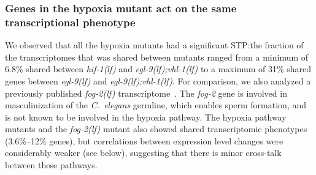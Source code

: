 \documentclass[9pt,twocolumn,twoside,lineno]{pnas-new}
\newcommand{\cel}{\emph{C.~elegans}}
\newcommand{\gene}[1]{\emph{#1}}
\newcommand{\fog}{\emph{\mbox{fog-2(lf)}}}
\newcommand{\egl}{\emph{\mbox{egl-9}(lf)}}
\newcommand{\rhy}{\emph{\mbox{rhy-1}(lf)}}
\newcommand{\eglvhl}{\emph{\mbox{egl-9(lf);vhl-1(lf)}}}
\newcommand{\hif}{\emph{\mbox{hif-1(lf)}}}
\begin{document}
\subsubsection*{Genes in the hypoxia mutant act on the same transcriptional phenotype}
\label{sec:phenotypes}
We observed that all the hypoxia mutants had a significant STP:\@ the fraction of
the transcriptomes that was shared between mutants
ranged from a minimum of 6.8\% shared between \hif{} and \eglvhl{} to a maximum
of 31\% shared genes between \egl{} and \eglvhl{}. For comparison, we also
analyzed a previously published \fog{} transcriptome~\cite{Angeles-Albores2016a}.
The \gene{fog-2} gene is involved in masculinization of the \cel{} germline,
which enables sperm formation, and is not known to be involved in the hypoxia
pathway. The hypoxia pathway mutants and the \fog{} mutant also showed shared
transcriptomic phenotypes (3.6\%--12\% genes), but correlations between
expression level changes were considerably weaker (see below), suggesting that
there is minor cross-talk between these pathways.

\end{document}
